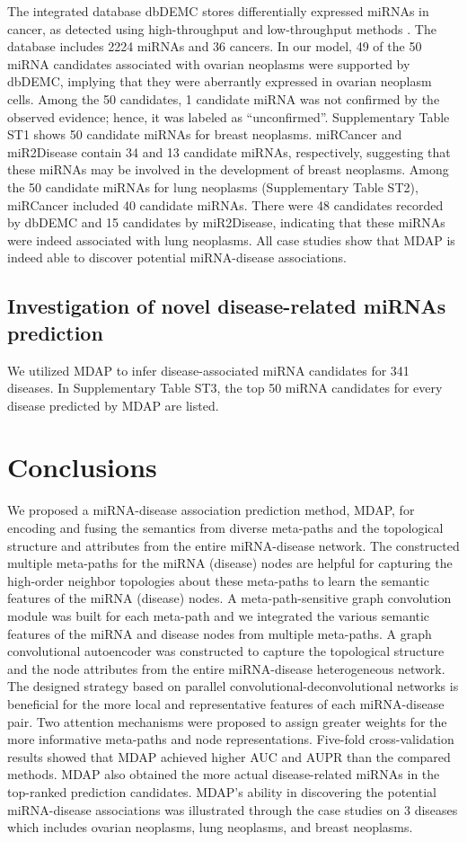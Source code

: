 \documentclass[journal,twoside,web]{ieeecolor}
\begin{document}
The integrated database dbDEMC stores differentially expressed miRNAs in cancer, as detected using high-throughput and low-throughput methods \cite{DBLP:journals/nar/YangWWTZZT17}. The database includes 2224 miRNAs and 36 cancers. In our model, 49 of the 50 miRNA candidates associated with ovarian neoplasms were supported by dbDEMC, implying that they were aberrantly expressed in ovarian neoplasm cells. Among the 50 candidates, 1 candidate miRNA was not confirmed by the observed evidence; hence, it was labeled as “unconfirmed”. Supplementary Table ST1 shows 50 candidate miRNAs for breast neoplasms. miRCancer and miR2Disease contain 34 and 13 candidate miRNAs, respectively, suggesting that these miRNAs may be involved in the development of breast neoplasms. Among the 50 candidate miRNAs for lung neoplasms (Supplementary Table ST2), miRCancer included 40 candidate miRNAs. There were 48 candidates recorded by dbDEMC and 15 candidates by miR2Disease, indicating that these miRNAs were indeed associated with lung neoplasms. All case studies show that MDAP is indeed able to discover potential miRNA-disease associations. 

\subsection{Investigation of novel disease-related miRNAs prediction}
We utilized MDAP to infer disease-associated miRNA candidates for 341 diseases. In Supplementary Table ST3, the top 50 miRNA candidates for every disease predicted by MDAP are listed.

\section{Conclusions}
We proposed a miRNA-disease association prediction method, MDAP, for encoding and fusing the semantics from diverse meta-paths and the topological structure and attributes from the entire miRNA-disease network. The constructed multiple meta-paths for the miRNA (disease) nodes are helpful for capturing the high-order neighbor topologies about these meta-paths to learn the semantic features of the miRNA (disease) nodes. A meta-path-sensitive graph convolution module was built for each meta-path and we integrated the various semantic features of the miRNA and disease nodes from multiple meta-paths. A graph convolutional autoencoder was constructed to capture the topological structure and the node attributes from the entire miRNA-disease heterogeneous network. The designed strategy based on parallel convolutional-deconvolutional networks is beneficial for the more local and representative features of each miRNA-disease pair. Two attention mechanisms were proposed to assign greater weights for the more informative meta-paths and node representations. Five-fold cross-validation results showed that MDAP achieved higher AUC and AUPR than the compared methods. MDAP also obtained the more actual disease-related miRNAs in the top-ranked prediction candidates. MDAP’s ability in discovering the potential miRNA-disease associations was illustrated through the case studies on 3 diseases which includes ovarian neoplasms, lung neoplasms, and breast neoplasms.


\end{document}
